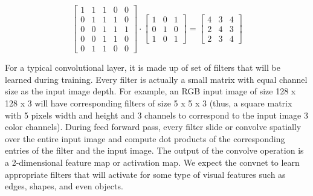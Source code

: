 \documentclass[master]{thesis-uestc}
\begin{document}
\begin{equation}
\begin{bmatrix}
1 & 1 & 1 & 0 & 0 \\
0 & 1 & 1 & 1 & 0 \\
0 & 0 & 1 & 1 & 1 \\
0 & 0 & 1 & 1 & 0 \\
0 & 1 & 1 & 0 & 0
\end{bmatrix}
\cdot
\begin{bmatrix}
1 & 0 & 1 \\
0 & 1 & 0 \\
1 & 0 & 1
\end{bmatrix}
=
\begin{bmatrix}
4 & 3 & 4 \\
2 & 4 & 3 \\
2 & 3 & 4
\end{bmatrix}
\label{conv_operation}
\end{equation}

For a typical convolutional layer, it is made up of set of filters that will be learned during training. Every filter is actually a small matrix with equal channel size as the input image depth. For example, an RGB input image of size 128 x 128 x 3 will have corresponding filters of size 5 x 5 x 3 (thus, a square matrix with 5 pixels width and height and 3 channels to correspond to the input image 3 color channels). During feed forward pass, every filter slide or convolve spatially over the entire input image and compute dot products of the corresponding entries of the filter and the input image. The output of the convolve operation is a 2-dimensional feature map or activation map. We expect the convnet to learn appropriate filters that will activate for some type of visual features such as edges, shapes, and even objects.   
\end{document}
